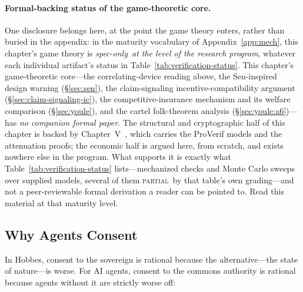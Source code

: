\documentclass[11pt,a4paper]{article}
\newcommand{\Partial}{{\textcolor{hhink}{\textsc{partial}}}}
\newcommand{\SpecOnly}{{\textcolor{hhgray}{\textit{spec-only}}}}
\theoremstyle{definition}
\theoremstyle{remark}
\begin{document}
\paragraph{Formal-backing status of the game-theoretic core.}
One disclosure belongs here, at the point the game theory enters, rather than buried in the appendix: in the maturity vocabulary of Appendix~\ref{app:mech}, this chapter's game theory is \SpecOnly\ \emph{at the level of the research program}, whatever each individual artifact's status in Table~\ref{tab:verification-status}. This chapter's game-theoretic core---the correlating-device reading above, the Sen-inspired design warning (\S\ref{sec:sen}), the claim-signaling incentive-compatibility argument (\S\ref{sec:claim-signaling-ic}), the competitive-insurance mechanism and its welfare comparison (\S\ref{sec:youle}), and the cartel folk-theorem analysis (\S\ref{sec:youle:a6})---has \emph{no companion formal paper}. The structural and cryptographic half of this chapter is backed by Chapter~V~\cite{owens2026anchor}, which carries the ProVerif models and the attenuation proofs; the economic half is argued here, from scratch, and exists nowhere else in the program. What supports it is exactly what Table~\ref{tab:verification-status} lists---mechanized checks and Monte Carlo sweeps over supplied models, several of them \Partial\ by that table's own grading---and not a peer-reviewable formal derivation a reader can be pointed to. Read this material at that maturity level.

\subsection{Why Agents Consent}\label{sec:why-consent}

In Hobbes, consent to the sovereign is rational because the alternative---the state of nature---is worse. For AI agents, consent to the commons authority is rational because agents without it are strictly worse off:
\end{document}
